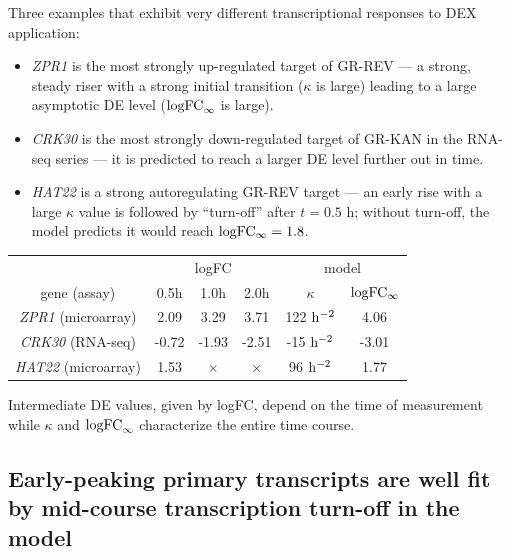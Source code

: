 \documentclass[aspb,landscape]{a0poster}
\begin{document}
\begin{multicols}{3}
  Three examples that exhibit very different transcriptional responses to DEX application:
  \begin{itemize}
  \item \textit{ZPR1} is the most strongly up-regulated target of GR-REV --- a strong, steady riser with a strong initial transition ($\kappa$ is large) leading to a large asymptotic DE level (${\rm logFC}_\infty$ is large).
  \item \textit{CRK30} is the most strongly down-regulated target of GR-KAN in the RNA-seq series --- it is predicted to reach a larger DE level further out in time.
  \item \textit{HAT22} is a strong autoregulating GR-REV target --- an early rise with a large $\kappa$ value is followed by ``turn-off'' after $t=0.5$ h; without turn-off, the model predicts it would reach $\rm logFC_\infty=1.8$.
  \end{itemize}

  \begin{center}
    \begin{tabular}{c|ccc|cc}
      \multicolumn{1}{c}{}        & \multicolumn{3}{c}{logFC} & \multicolumn{2}{c}{model} \\ 
      \multicolumn{1}{c}{gene (assay)} & 0.5h & 1.0h & \multicolumn{1}{c}{2.0h}  & $\kappa$        & $\rm logFC_\infty$ \\
      \midrule
      \textit{ZPR1}  (microarray) & 2.09 & 3.29 & 3.71         & 122 $\rm h^{-2}$ & 4.06 \\
      \textit{CRK30} (RNA-seq)    & -0.72 & -1.93 & -2.51      & -15 $\rm h^{-2}$ & -3.01 \\
      \textit{HAT22} (microarray) & 1.53 & $\times$ & $\times$ &  96 $\rm h^{-2}$ & 1.77 \\
    \end{tabular}
  \end{center}

  Intermediate DE values, given by logFC, depend on the time of measurement while $\kappa$ and ${\rm logFC}_\infty$ characterize the entire time course.

  \subsection*{Early-peaking primary transcripts are well fit by mid-course transcription turn-off in the model}


\end{multicols}
\end{document}
